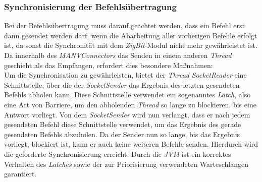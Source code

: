 \subsubsection{Synchronisierung der Befehlsübertragung}
Bei der Befehlsübertragung muss darauf geachtet werden, dass ein Befehl erst dann gesendet werden darf,
wenn die Abarbeitung aller vorherigen Befehle erfolgt ist, da sonst die Synchronität mit dem \emph{ZigBit}-Modul
nicht mehr gewährleistet ist. Da innerhalb des \emph{MANVConnectors} das Senden in einem anderen \emph{Thread} geschieht
als das Empfangen, erfordert dies besondere Maßnahmen:\\
Um die Synchronisation zu gewährleisten, bietet der \emph{Thread} \emph{SocketReader} eine Schnittstelle, über die der
\emph{SocketSender} das Ergebnis des letzten gesendeten Befehls abholen kann. Diese Schnittstelle verwendet ein sogenanntes
\emph{Latch}, also eine Art von Barriere, um den abholenden \emph{Thread} so lange zu blockieren, bis eine Antwort vorliegt.
Von dem \emph{SocketSender} wird nun verlangt, dass er nach jedem gesendeten Befehl diese Schnittstelle verwendet,
um das Ergebnis des gerade gesendeten Befehls abzuholen. Da der Sender nun so lange, bis das Ergebnis vorliegt, blockiert ist,
kann er auch keine weiteren Befehle senden. Hierdurch wird die geforderte Synchronisierung erreicht. Durch die \emph{JVM}
ist ein korrektes Verhalten des \emph{Latches} sowie der zur Priorisierung verwendeten Warteschlangen garantiert.
